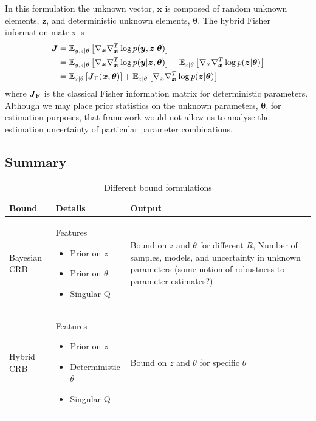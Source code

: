 \documentclass{article}
\renewcommand{\vec}[1]{\ensuremath{{\boldsymbol #1}}}
\newcommand{\mat}[1]{\ensuremath{\boldsymbol{#1}}}
\begin{document}
In this formulation the unknown vector, $\vec x$ is composed of random unknown elements, $\vec z$, and deterministic unknown elements, $\vec \theta$. The hybrid Fisher information matrix is
\begin{align}
	\mat J &= \mathbb E_{y,z|\theta}\left[ \nabla_{\vec x}\nabla_{\vec x}^T \log p(\vec y,\vec z|\vec\theta) \right] \\
	&= \mathbb E_{y,z|\theta}\left[ \nabla_{\vec x}\nabla_{\vec x}^T \log p(\vec y|\vec z,\vec\theta) \right] + \mathbb E_{z|\theta}\left[ \nabla_{\vec x}\nabla_{\vec x}^T \log p(\vec z|\vec\theta) \right] \\
	&= \mathbb E_{z|\theta}\left[ \mat J_{\rm F}(\vec x,\vec\theta) \right] + \mathbb E_{z|\theta}\left[ \nabla_{\vec x}\nabla_{\vec x}^T \log p(\vec z|\vec\theta) \right]
\end{align}
where $\mat J_{\rm F}$ is the classical Fisher information matrix for deterministic parameters. Although we may place prior statistics on the unknown parameters, $\vec\theta$, for estimation purposes, that framework would not allow us to analyse the estimation uncertainty of particular parameter combinations.

\subsection{Summary}


\begin{table}[H]
\caption{Different bound formulations}
\label{tbl:bound_types}
\centering
\begin{tabular}{p{}p{}p{}}
  \toprule
  Bound & Details & Output  \\
  \midrule
Bayesian CRB & Features \begin{itemize}
     \item Prior on $z$ 
	\item Prior on $\theta$
	\item Singular Q
  \end{itemize} & Bound on $z$ and $\theta$ for different $R$, Number of samples, models, and uncertainty in unknown parameters (some notion of robustness to parameter estimates?)  \\
Hybrid CRB & Features \begin{itemize}
     \item Prior on $z$ 
	\item Deterministic $\theta$
	\item Singular Q
  \end{itemize} & Bound on $z$ and $\theta$ for specific $\theta$  \\
  \bottomrule
\end{tabular}
\end{table}
\end{document}
